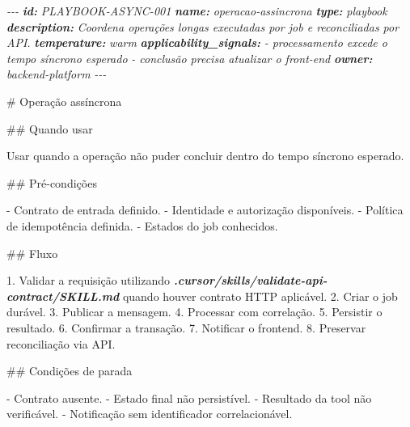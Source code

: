 \documentclass[
  10pt,
  a4paper,
  oneside]{book}
\newenvironment{Shaded}{}{}
\newcommand{\AnnotationTok}[1]{\textcolor[rgb]{0.38,0.63,0.69}{\textbf{\textit{#1}}}}
\newcommand{\CommentTok}[1]{\textcolor[rgb]{0.38,0.63,0.69}{\textit{#1}}}
\newcommand{\FunctionTok}[1]{\textcolor[rgb]{0.02,0.16,0.49}{#1}}
\newcommand{\InformationTok}[1]{\textcolor[rgb]{0.38,0.63,0.69}{\textbf{\textit{#1}}}}
\newcommand{\NormalTok}[1]{#1}
\newcommand{\SpecialStringTok}[1]{\textcolor[rgb]{0.73,0.40,0.53}{#1}}
\renewenvironment{Shaded}{\begin{snugshade}}{\end{snugshade}}%
\begin{document}
\begin{Shaded}
\begin{Highlighting}[]
\CommentTok{{-}{-}{-}}
\AnnotationTok{id:}\CommentTok{ PLAYBOOK{-}ASYNC{-}001}
\AnnotationTok{name:}\CommentTok{ operacao{-}assincrona}
\AnnotationTok{type:}\CommentTok{ playbook}
\AnnotationTok{description:}\CommentTok{ Coordena operações longas executadas por job e reconciliadas por API.}
\AnnotationTok{temperature:}\CommentTok{ warm}
\AnnotationTok{applicability\_signals:}
\CommentTok{  {-} processamento excede o tempo síncrono esperado}
\CommentTok{  {-} conclusão precisa atualizar o front{-}end}
\AnnotationTok{owner:}\CommentTok{ backend{-}platform}
\CommentTok{{-}{-}{-}}

\FunctionTok{\# Operação assíncrona}

\FunctionTok{\#\# Quando usar}

\NormalTok{Usar quando a operação não puder concluir dentro do tempo síncrono esperado.}

\FunctionTok{\#\# Pré{-}condições}

\SpecialStringTok{{-} }\NormalTok{Contrato de entrada definido.}
\SpecialStringTok{{-} }\NormalTok{Identidade e autorização disponíveis.}
\SpecialStringTok{{-} }\NormalTok{Política de idempotência definida.}
\SpecialStringTok{{-} }\NormalTok{Estados do job conhecidos.}

\FunctionTok{\#\# Fluxo}

\SpecialStringTok{1. }\NormalTok{Validar a requisição utilizando }\InformationTok{\textasciigrave{}.cursor/skills/validate{-}api{-}contract/SKILL.md\textasciigrave{}}\NormalTok{ quando houver contrato HTTP aplicável.}
\SpecialStringTok{2. }\NormalTok{Criar o job durável.}
\SpecialStringTok{3. }\NormalTok{Publicar a mensagem.}
\SpecialStringTok{4. }\NormalTok{Processar com correlação.}
\SpecialStringTok{5. }\NormalTok{Persistir o resultado.}
\SpecialStringTok{6. }\NormalTok{Confirmar a transação.}
\SpecialStringTok{7. }\NormalTok{Notificar o frontend.}
\SpecialStringTok{8. }\NormalTok{Preservar reconciliação via API.}

\FunctionTok{\#\# Condições de parada}

\SpecialStringTok{{-} }\NormalTok{Contrato ausente.}
\SpecialStringTok{{-} }\NormalTok{Estado final não persistível.}
\SpecialStringTok{{-} }\NormalTok{Resultado da tool não verificável.}
\SpecialStringTok{{-} }\NormalTok{Notificação sem identificador correlacionável.}
\end{Highlighting}
\end{Shaded}
\end{document}
